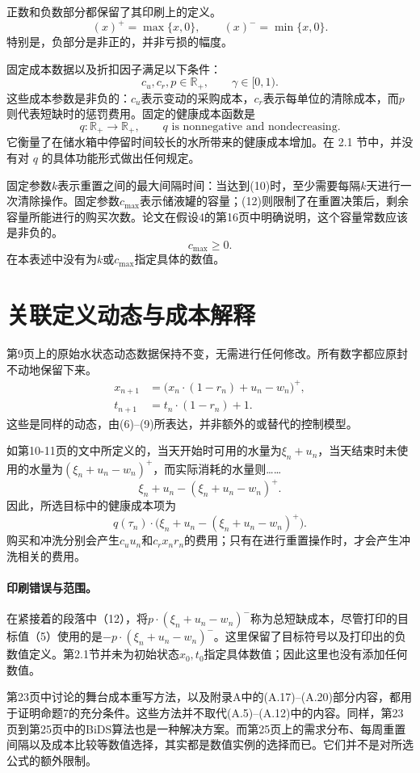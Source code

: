 \documentclass{article}
\begin{document}
正数和负数部分都保留了其印刷上的定义。
\[
(x)^+=\max\{x,0\},\qquad (x)^-=\min\{x,0\}.
\]
特别是，负部分是非正的，并非亏损的幅度。

固定成本数据以及折扣因子满足以下条件：
\[
c_u,c_r,p\in\mathbb{R}_+,\qquad \gamma\in[0,1).
\]
这些成本参数是非负的：$c_u$表示变动的采购成本，$c_r$表示每单位的清除成本，而$p$则代表短缺时的惩罚费用。固定的健康成本函数是
\[
q:\mathbb{R}_+\longrightarrow\mathbb{R}_+,
\qquad q\text{ is nonnegative and nondecreasing}.
\]
它衡量了在储水箱中停留时间较长的水所带来的健康成本增加。在 2.1 节中，并没有对 $q$ 的具体功能形式做出任何规定。

固定参数$k$表示重置之间的最大间隔时间：当达到(10)时，至少需要每隔$k$天进行一次清除操作。固定参数$c_{\max}$表示储液罐的容量；(12)则限制了在重置决策后，剩余容量所能进行的购买次数。论文在假设4的第16页中明确说明，这个容量常数应该是非负的。
\[
c_{\max}\geq0.
\]
在本表述中没有为$k$或$c_{\max}$指定具体的数值。

\section*{关联定义动态与成本解释}
第9页上的原始水状态动态数据保持不变，无需进行任何修改。所有数字都应原封不动地保留下来。
\begin{align}
x_{n+1}&=\bigl(x_n\cdot(1-r_n)+u_n-w_n\bigr)^+,\tag{3}\\
t_{n+1}&=t_n\cdot(1-r_n)+1.\tag{4}
\end{align}
这些是同样的动态，由(6)--(9)所表达，并非额外的或替代的控制模型。

如第10-11页的文中所定义的，当天开始时可用的水量为$\xi_n+u_n$，当天结束时未使用的水量为$(\xi_n+u_n-w_n)^+$，而实际消耗的水量则……
\[
\xi_n+u_n-(\xi_n+u_n-w_n)^+.
\]
因此，所选目标中的健康成本项为
\[
q(\tau_n)\cdot\bigl(\xi_n+u_n-(\xi_n+u_n-w_n)^+\bigr).
\]
购买和冲洗分别会产生$c_u u_n$和$c_r x_n r_n$的费用；只有在进行重置操作时，才会产生冲洗相关的费用。

\paragraph{印刷错误与范围。}
在紧接着的段落中（12），将$p\cdot(\xi_n+u_n-w_n)^-$称为总短缺成本，尽管打印的目标值（5）使用的是$-p\cdot(\xi_n+u_n-w_n)^-$。这里保留了目标符号以及打印出的负数值定义。第2.1节并未为初始状态$x_0,t_0$指定具体数值；因此这里也没有添加任何数值。

第23页中讨论的舞台成本重写方法，以及附录A中的(A.17)--(A.20)部分内容，都用于证明命题7的充分条件。这些方法并不取代(A.5)--(A.12)中的内容。同样，第23页到第25页中的BiDS算法也是一种解决方案。而第25页上的需求分布、每周重置间隔以及成本比较等数值选择，其实都是数值实例的选择而已。它们并不是对所选公式的额外限制。
\end{document}
